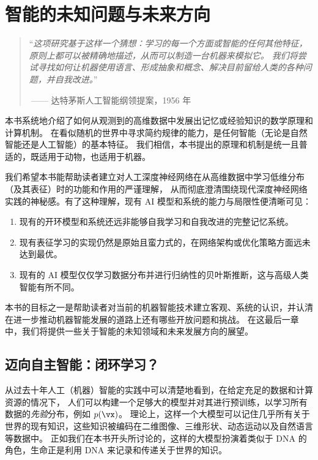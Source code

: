 \documentclass[../../book-main_zh.tex]{subfiles}
\begin{document}
\chapter{智能的未知问题与未来方向}
\label{ch:future}

\begin{quote}
    ``{\em 这项研究基于这样一个猜想：学习的每一个方面或智能的任何其他特征，原则上都可以被精确地描述，从而可以制造一台机器来模拟它。
    我们将尝试寻找如何让机器使用语言、形成抽象和概念、解决目前留给人类的各种问题，并自我改进。}''

    $~$\hfill —— 达特茅斯人工智能纲领提案，1956 年
\end{quote}
\vspace{5mm}

本书系统地介绍了如何从观测到的高维数据中发展出记忆或经验知识的数学原理和计算机制。
在看似随机的世界中寻求简约规律的能力，是任何智能（无论是自然智能还是人工智能）的基本特征。
我们相信，本书提出的原理和机制是统一且普适的，既适用于动物，也适用于机器。

我们希望本书能帮助读者建立对人工深度神经网络在从高维数据中学习低维分布（及其表征）时的功能和作用的严谨理解，
从而彻底澄清围绕现代深度神经网络实践的神秘感。有了这种理解，现有 AI 模型和系统的能力与局限性便清晰可见：
\begin{enumerate}
    \item 现有的开环模型和系统还远非能够自我学习和自我改进的完整记忆系统。
    \item 现有表征学习的实现仍然是原始且蛮力式的，在网络架构或优化策略方面远未达到最优。
    \item 现有的 AI 模型仅仅学习数据分布并进行归纳性的贝叶斯推断，这与高级人类智能有所不同。
\end{enumerate}

本书的目标之一是帮助读者对当前的机器智能技术建立客观、系统的认识，并认清在进一步推动机器智能发展的道路上还有哪些开放问题和挑战。
在这最后一章中，我们将提供一些关于智能的未知领域和未来发展方向的展望。

\section{迈向自主智能：闭环学习？}
从过去十年人工（机器）智能的实践中可以清楚地看到，在给定充足的数据和计算资源的情况下，
人们可以构建一个足够大的模型并对其进行预训练，以学习所有数据的\textit{先验}分布，例如 \(p(\vx)\)。
理论上，这样一个大模型可以记住几乎所有关于世界的现有知识，这些知识被编码在二维图像、三维形状、动态运动以及自然语言等数据中。
正如我们在本书开头所讨论的，这样的大模型扮演着类似于 DNA 的角色，生命正是利用 DNA 来记录和传递关于世界的知识。
\end{document}
